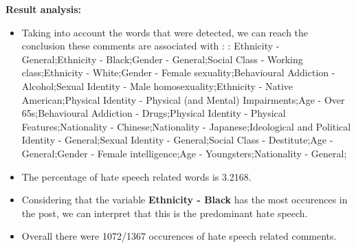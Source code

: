 \documentclass[11pt]{article}
\begin{document}
\textbf{\Large Result analysis:}

\begin{itemize}\item Taking into account the words that were detected, we can reach the conclusion these comments are associated with : : Ethnicity - General;Ethnicity - Black;Gender - General;Social Class - Working class;Ethnicity - White;Gender - Female sexuality;Behavioural Addiction - Alcohol;Sexual Identity - Male homosexuality;Ethnicity - Native American;Physical Identity - Physical (and Mental) Impairments;Age - Over 65s;Behavioural Addiction - Drugs;Physical Identity - Physical Features;Nationality - Chinese;Nationality - Japanese;Ideological and Political Identity - General;Sexual Identity - General;Social Class - Destitute;Age - General;Gender - Female intelligence;Age - Youngsters;Nationality - General;%

\item The percentage of hate speech related words is 3.2168.

\item Considering that the variable \textbf{Ethnicity - Black} has the most occurences in the post, we can interpret that this is the predominant hate speech.

\item Overall there were 1072/1367 occurences of hate speech related comments.\end{itemize}
\end{document}
